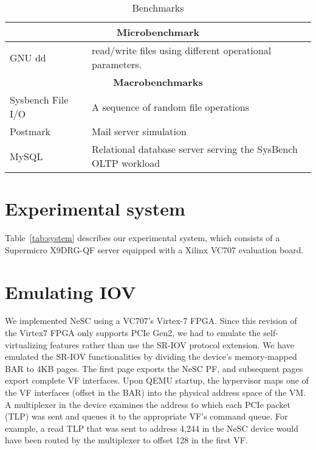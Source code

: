 \begin{table}[ht]
  \small
  \begin{tabular}{|p{}|p{}|}
    \hline
    \multicolumn{2}{|c|}{\textbf{Microbenchmark}} \\
    \hline
    GNU dd~\cite{coreutils}	& read/write files using different operational parameters.\\
    \hline
    \hline
    \multicolumn{2}{|c|}{\textbf{Macrobenchmarks}} \\
    \hline
    Sysbench File I/O~\cite{kopytov2004sysbench}
    			& A sequence of random file operations \\
    \hline
    Postmark~\cite{katcher1997postmark}
    			& Mail server simulation \\
    \hline
    MySQL~\cite{mysql}	& Relational database server serving the SysBench OLTP workload  \\
    \hline
    \hline
  \end{tabular}

  \vspace*{-2ex}
  \caption{Benchmarks\label{tab:bench}}


\end{table}


\section*{Experimental system}
Table~\ref{tab:system} describes our experimental system, which consists of a Supermicro X9DRG-QF server equipped with a Xilinx VC707 evaluation board.

\section*{Emulating IOV}
We implemented NeSC using a VC707's Virtex-7 FPGA. Since this revision of the Virtex7 FPGA only supports PCIe Gen2, we had to emulate the self-virtualizing features rather than use the SR-IOV protocol extension. We have emulated the SR-IOV functionalities by dividing the device's memory-mapped BAR to 4KB pages. The first page exports the NeSC PF, and subsequent pages export complete VF interfaces. Upon QEMU startup, the hypervisor maps one of the VF interfaces (offset in the BAR) into the physical address space of the VM. A  multiplexer in the device examines the address to which each PCIe packet (TLP) was sent and queues it to the appropriate VF's command queue. For example, a read TLP that was sent to address 4,244 in the NeSC device would have been routed by the multiplexer to offset 128 in the first VF.

